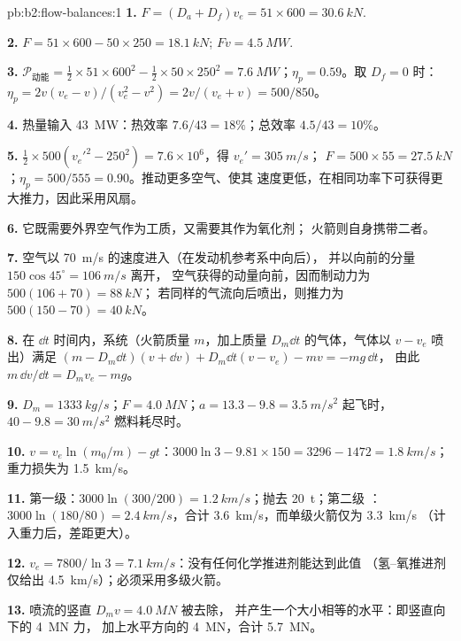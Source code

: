 \begin{solution}{pb:b2:flow-balances:1}
\textbf{1.} $F = (D_a + D_f)v_e = 51 \times 600 = \qty{30.6}{kN}$.

\textbf{2.} $F = 51 \times 600 - 50 \times 250 = \qty{18.1}{kN}$; $Fv = \qty{4.5}{MW}$.

\textbf{3.} $\mathcal P_{\text{动能}} = \tfrac12 \times 51 \times 600^2 - \tfrac12 \times 50 \times 250^2 =
\qty{7.6}{MW}$；$\eta_p = 0.59$。取 $D_f = 0$ 时：$\eta_p = 2v(v_e - v)/(v_e^2 - v^2)
= 2v/(v_e + v) = 500/850$。

\textbf{4.} 热量输入 \qty{43}{MW}：热效率 $7.6/43 = 18\%$；总效率 $4.5/43 = 10\%$。

\textbf{5.} $\tfrac12 \times 500(v_e'^2 - 250^2) = 7.6 \times 10^6$，得 $v_e' = \qty{305}{m/s}$；
$F = 500 \times 55 = \qty{27.5}{kN}$；$\eta_p = 500/555 = 0.90$。推动更多空气、使其
速度更低，在相同功率下可获得更大推力，因此采用风扇。

\textbf{6.} 它既需要外界空气作为工质，又需要其作为氧化剂；
火箭则自身携带二者。

\textbf{7.} 空气以 \qty{70}{m/s} 的速度进入（在发动机参考系中向后），
并以向前的分量 $150\cos45^\circ = \qty{106}{m/s}$ 离开，
空气获得的动量向前，因而制动力为 $500(106 + 70) = \qty{88}{kN}$；
若同样的气流向后喷出，则推力为 $500(150 - 70) =
\qty{40}{kN}$。

\textbf{8.} 在 $\dd t$ 时间内，系统（火箭质量 $m$，加上质量 $D_m\dd t$ 的气体，气体以 $v - v_e$ 喷出）满足
$(m - D_m\dd t)(v + \dd v) + D_m\dd t(v - v_e) - mv = -mg\,\dd t$，
由此 $m\,\dd v/\dd t = D_mv_e - mg$。

\textbf{9.} $D_m = \qty{1333}{kg/s}$；$F = \qty{4.0}{MN}$；$a = 13.3 - 9.8 =
\qty{3.5}{m/s^2}$ 起飞时，$40 - 9.8 = \qty{30}{m/s^2}$ 燃料耗尽时。

\textbf{10.} $v = v_e\ln(m_0/m) - gt$：$3000\ln3 - 9.81 \times 150 = 3296 - 1472 =
\qty{1.8}{km/s}$；重力损失为 \qty{1.5}{km/s}。

\textbf{11.} 第一级：$3000\ln(300/200) = \qty{1.2}{km/s}$；抛去 \qty{20}{t}；第二级
：$3000\ln(180/80) = \qty{2.4}{km/s}$，合计 \qty{3.6}{km/s}，而单级火箭仅为 \qty{3.3}{km/s}
（计入重力后，差距更大）。

\textbf{12.} $v_e = 7800/\ln3 = \qty{7.1}{km/s}$：没有任何化学推进剂能达到此值
（氢–氧推进剂仅给出 \qty{4.5}{km/s}）；必须采用多级火箭。

\textbf{13.} 喷流的竖直 $D_mv = \qty{4.0}{MN}$ 被去除，
并产生一个大小相等的水平：即竖直向下的 \qty{4}{MN} 力，
加上水平方向的 \qty{4}{MN}，合计 \qty{5.7}{MN}。


\end{solution}
